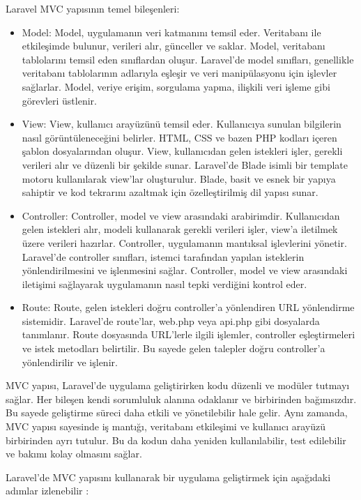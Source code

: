  Laravel MVC yapısının temel bileşenleri:
\begin{itemize}
\item Model:
Model, uygulamanın veri katmanını temsil eder. Veritabanı ile etkileşimde bulunur, verileri alır, günceller ve saklar. Model, veritabanı tablolarını temsil eden sınıflardan oluşur. Laravel'de model sınıfları, genellikle veritabanı tablolarının adlarıyla eşleşir ve veri manipülasyonu için işlevler sağlarlar. Model, veriye erişim, sorgulama yapma, ilişkili veri işleme gibi görevleri üstlenir.

\item View:
View, kullanıcı arayüzünü temsil eder. Kullanıcıya sunulan bilgilerin nasıl görüntüleneceğini belirler. HTML, CSS ve bazen PHP kodları içeren şablon dosyalarından oluşur. View, kullanıcıdan gelen istekleri işler, gerekli verileri alır ve düzenli bir şekilde sunar. Laravel'de Blade isimli bir template motoru kullanılarak view'lar oluşturulur. Blade, basit ve esnek bir yapıya sahiptir ve kod tekrarını azaltmak için özelleştirilmiş dil yapısı sunar.

\item Controller:
Controller, model ve view arasındaki arabirimdir. Kullanıcıdan gelen istekleri alır, modeli kullanarak gerekli verileri işler, view'a iletilmek üzere verileri hazırlar. Controller, uygulamanın mantıksal işlevlerini yönetir. Laravel'de controller sınıfları, istemci tarafından yapılan isteklerin yönlendirilmesini ve işlenmesini sağlar. Controller, model ve view arasındaki iletişimi sağlayarak uygulamanın nasıl tepki verdiğini kontrol eder.

\item Route:
Route, gelen istekleri doğru controller'a yönlendiren URL yönlendirme sistemidir. Laravel'de route'lar, web.php veya api.php gibi dosyalarda tanımlanır. Route dosyasında URL'lerle ilgili işlemler, controller eşleştirmeleri ve istek metodları belirtilir. Bu sayede gelen talepler doğru controller'a yönlendirilir ve işlenir.
\end{itemize}
MVC yapısı, Laravel'de uygulama geliştirirken kodu düzenli ve modüler tutmayı sağlar. Her bileşen kendi sorumluluk alanına odaklanır ve birbirinden bağımsızdır. Bu sayede geliştirme süreci daha etkili ve yönetilebilir hale gelir.
Aynı  zamanda, MVC yapısı sayesinde iş mantığı, veritabanı etkileşimi ve kullanıcı arayüzü birbirinden ayrı tutulur. Bu da kodun daha yeniden kullanılabilir, test edilebilir ve bakımı kolay olmasını sağlar.

Laravel'de MVC yapısını kullanarak bir uygulama geliştirmek için aşağıdaki adımlar izlenebilir :


